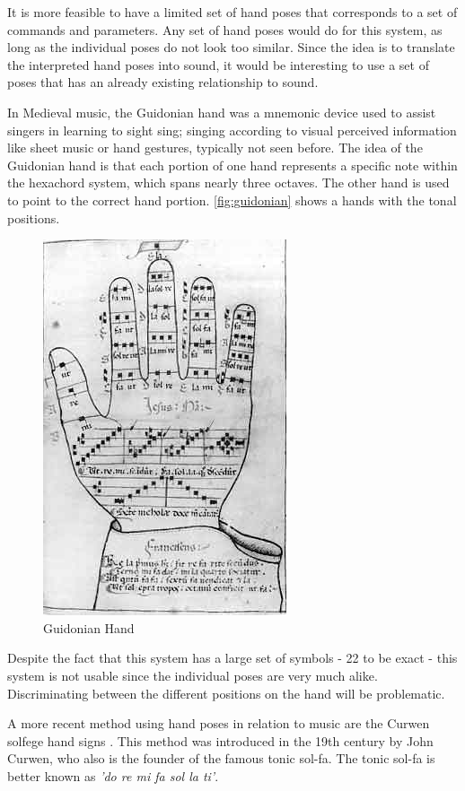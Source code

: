 It is more feasible to have a limited set of hand poses that corresponds to a set of commands and parameters.  Any set of hand poses would do for this system, as long as the individual poses do not look too similar. Since the idea is to translate the interpreted hand poses into sound, it would be interesting to use a set of poses that has an already existing relationship to sound.

In Medieval music, the Guidonian hand was a mnemonic device used to assist singers in learning to sight sing; singing according to visual perceived information like sheet music or hand gestures, typically not seen before. The idea of the Guidonian hand is that each portion of one hand represents a specific note within the hexachord system, which spans nearly three octaves. The other hand is used to point to the correct hand portion. \autoref{fig:guidonian} shows a hands with the tonal positions.

\begin{figure}[tb]
	\centering{}
	\includegraphics[width=0.3\linewidth]{figures/guidonian_hand.jpg}
	\caption{Guidonian Hand}
	\label{fig:guidonian}
\end{figure}

Despite the fact that this system has a large set of symbols - 22 to be exact - this system is not usable since the individual poses are very much alike. Discriminating between the different positions on the hand will be problematic.

A more recent method using hand poses in relation to music are the Curwen solfege hand signs \citep{choksy1999}. This method was introduced in the 19th century by John Curwen, who also is the founder of the famous tonic sol-fa. The tonic sol-fa is better known as \emph{'do re mi fa sol la ti'}.

